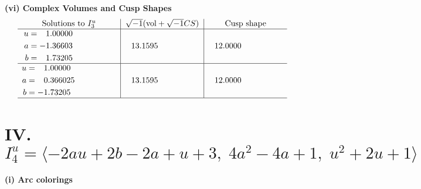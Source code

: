 \documentclass[1p]{elsarticle_modified}
\theoremstyle{definition}
\newcommand{\I}{\sqrt{-1}}
\begin{document}
\newpage\flushleft \textbf{(vi) Complex Volumes and Cusp Shapes}
$$\begin{array}{c|c|c}  
\text{Solutions to }I^u_{3}& \I (\text{vol} + \sqrt{-1}CS) & \text{Cusp shape}\\
 \hline 
\begin{aligned}
u &= \phantom{-}1.00000\phantom{ +0.000000I} \\
a &= -1.36603\phantom{ +0.000000I} \\
b &= \phantom{-}1.73205\phantom{ +0.000000I}\end{aligned}
 & \phantom{-}13.1595\phantom{ +0.000000I} & \phantom{-}12.0000\phantom{ +0.000000I} \\ \hline\begin{aligned}
u &= \phantom{-}1.00000\phantom{ +0.000000I} \\
a &= \phantom{-}0.366025\phantom{ +0.000000I} \\
b &= -1.73205\phantom{ +0.000000I}\end{aligned}
 & \phantom{-}13.1595\phantom{ +0.000000I} & \phantom{-}12.0000\phantom{ +0.000000I}\\
 \hline 
 \end{array}$$\newpage\newpage\renewcommand{\arraystretch}{1}
\centering \section*{IV. $I^u_{4}= \langle -2 a u+2 b-2 a+u+3,\;4 a^2-4 a+1,\;u^2+2 u+1 \rangle$}
\flushleft \textbf{(i) Arc colorings}\\
\end{document}
